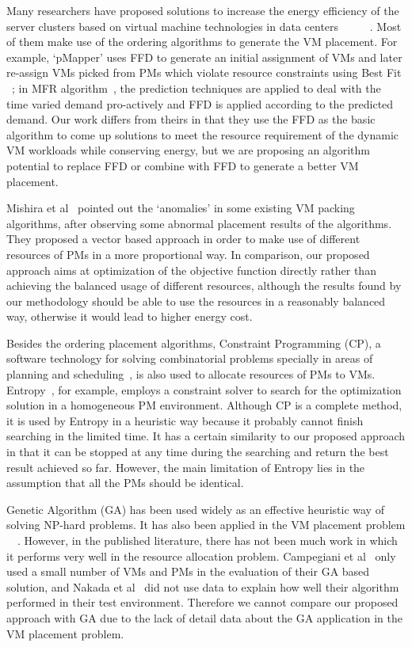\documentclass[10pt, conference, compsocconf]{IEEEtran}
\begin{document}
Many researchers have proposed solutions to increase the energy efficiency of
the server clusters based on virtual machine technologies in data centers
~\cite{verma08}~\cite{verma09}~\cite{wood09}~\cite{kusic09}~\cite{stillwell10}.
Most of them make use of the ordering algorithms to generate the VM
placement. For example, `pMapper' uses FFD to generate an initial assignment of VMs and later re-assign
VMs picked from PMs which violate resource constraints using Best Fit
~\cite{verma08}; in MFR algorithm~\cite{Bobroff07}, the prediction techniques are applied to deal
with the time varied demand pro-actively and FFD is applied according to the
predicted demand. 
Our work differs from theirs in that they use the FFD as
the basic algorithm to come up solutions to meet the resource requirement of the
dynamic VM workloads while conserving energy, but we are proposing an algorithm potential
to replace FFD or combine with FFD to generate a better VM placement.

Mishira et al~\cite{mashira11} pointed out the `anomalies' in some existing VM
packing algorithms, after observing some abnormal placement results of the
algorithms. They proposed a vector based approach in order to
make use of different resources of PMs in a more proportional way. In comparison, our proposed approach aims at
optimization of the objective function directly rather than achieving the
balanced usage of different resources, although the results found by our methodology should be
able to use the resources in a reasonably balanced way, otherwise it would lead
to higher energy cost.

Besides the ordering placement algorithms, Constraint Programming (CP), a
software technology for solving combinatorial problems specially in areas of
planning and scheduling~\cite{nakada09}, is also used to allocate resources of
PMs to VMs.
Entropy~\cite{hermenier09}, for example, employs a 
constraint solver to search for the optimization solution in a homogeneous PM
environment. 
Although CP is a complete method, it is used by Entropy in a heuristic way
because it probably cannot finish searching in the limited time. It has a
certain similarity to our proposed approach in that it can be stopped at any
time during the searching and return the best result achieved so far. However,
the main limitation of Entropy lies in the assumption that all the PMs should be identical.

Genetic Algorithm (GA) has been used widely as an effective heuristic way of
solving NP-hard problems. It has also been applied in the VM placement problem
~\cite{nakada09}~\cite{campegiani09}.
However, in the published literature, there has not been much work in which it
performs very well in the resource allocation problem. Campegiani et
al~\cite{campegiani09} only used a small number of VMs and PMs in the evaluation
of their GA based solution, and Nakada et al~\cite{nakada09} did not use data to explain how well their
algorithm performed in their test environment. Therefore we cannot compare our proposed approach
with GA due to the lack of detail data about the GA application in the VM
placement problem.
\end{document}
